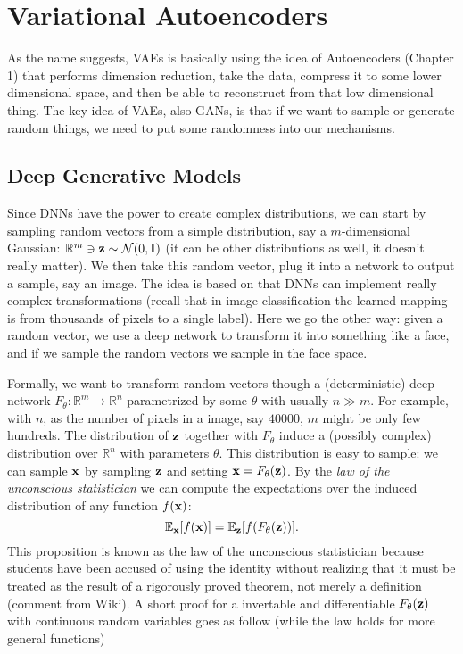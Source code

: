 \documentclass[../main.tex]{subfiles}
\begin{document}
\section{Variational Autoencoders}
As the name suggests, VAEs is basically using the idea of Autoencoders (Chapter 1) that performs dimension reduction, take the data, compress it to some lower dimensional space, and then be able to reconstruct from that low dimensional thing. The key idea of VAEs, also GANs, is that if we want to sample or generate random things, we need to put some randomness into our mechanisms. 
\subsection{Deep Generative Models}
\par Since DNNs have the power to create complex distributions, we can start by sampling random vectors from a simple distribution, say a $m$-dimensional Gaussian: $\mathbb{R}^{m}\ni {\bf z}\sim \mathcal{N}(0,{\bf I})$ (it can be other distributions as well, it doesn't really matter). We then take this random vector, plug it into a network to output a sample, say an image. The idea is based on that DNNs can implement really complex transformations (recall that in image classification the learned mapping is from thousands of pixels to a single label). Here we go the other way: given a random vector, we use a deep network to transform it into something like a face, and if we sample the random vectors we sample in the face space. 
\par Formally, we want to transform random vectors though a (deterministic) deep network $F_{\theta}:\mathbb{R}^m\rightarrow\mathbb{R}^n$ parametrized by some $\theta$ with usually $n\gg m$. For example, with $n$, as the number of pixels in a image, say $40000$, $m$ might be only few hundreds. The distribution of ${\bf z}$ together with $F_{\theta}$ induce a (possibly complex) distribution over $\mathbb{R}^n$ with parameters $\theta$. This distribution is easy to sample: we can sample ${\bf x}$ by sampling ${\bf z}$ and setting ${\bf x}=F_{\theta}({\bf z})$. By the \emph{law of the unconscious statistician} we can compute the expectations over the induced distribution of any function $f({\bf x})$:
\begin{equation}\label{eq_8_lotus}
\mathbb{E}_{\bf x}[f({\bf x})]=\mathbb{E}_{\bf z}[f(F_{\theta}({\bf z}))].
\end{equation}
This proposition is known as the law of the unconscious statistician because students have been accused of using the identity without realizing that it must be treated as the result of a rigorously proved theorem, not merely a definition (comment from Wiki). A short proof for a invertable and differentiable $F_{\theta}({\bf z})$ with continuous random variables goes as follow (while the law holds for more general functions)
\end{document}
